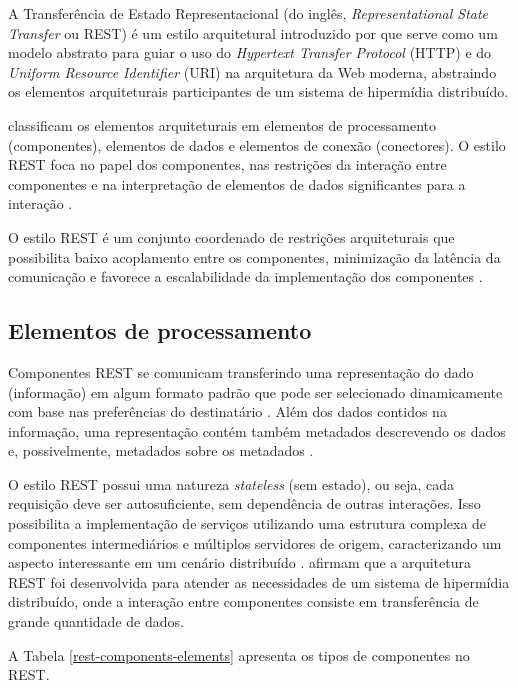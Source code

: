   A Transferência de Estado Representacional (do inglês, \textit{Representational State Transfer} ou REST)
  é um estilo arquitetural introduzido por  que serve como um modelo abstrato
  para guiar o uso do \textit{Hypertext Transfer Protocol} (HTTP) e do \textit{Uniform Resource Identifier} (URI)
  na arquitetura da Web moderna, abstraindo os elementos arquiteturais participantes de um sistema de
  hipermídia distribuído.
  
   classificam os elementos arquiteturais em elementos de processamento (componentes),
  elementos de dados e elementos de conexão (conectores). O estilo REST foca no papel dos componentes, nas restrições
  da interação entre componentes e na interpretação de elementos de dados significantes para a interação \cite{fielding2002}.
  
  O estilo REST é um conjunto coordenado de restrições arquiteturais que possibilita baixo acoplamento entre os componentes,
  minimização da latência da comunicação e favorece a escalabilidade da implementação dos componentes \cite{fielding2002}.
  
  \subsection{Elementos de processamento}
  
    Componentes REST se comunicam transferindo uma representação do dado (informação) em algum formato padrão que pode
    ser selecionado dinamicamente com base nas preferências do destinatário \cite{fielding2002}. Além dos dados contidos na 
    informação, uma representação contém também metadados descrevendo os dados e, possivelmente, metadados sobre os
    metadados \cite{fielding2002}.
    
    O estilo REST possui uma natureza \textit{stateless} (sem estado), ou seja, cada requisição deve ser autosuficiente, sem
    dependência de outras interações. Isso possibilita a implementação de serviços utilizando uma estrutura complexa de componentes
    intermediários e múltiplos servidores de origem, caracterizando um aspecto interessante em um cenário distribuído \cite{fielding2002}.
     afirmam que a arquitetura REST foi desenvolvida para atender as necessidades de um sistema de
    hipermídia distribuído, onde a interação entre componentes consiste em transferência de grande quantidade de dados.
    
    A Tabela \ref{rest-components-elements} apresenta os tipos de componentes no REST.
  
